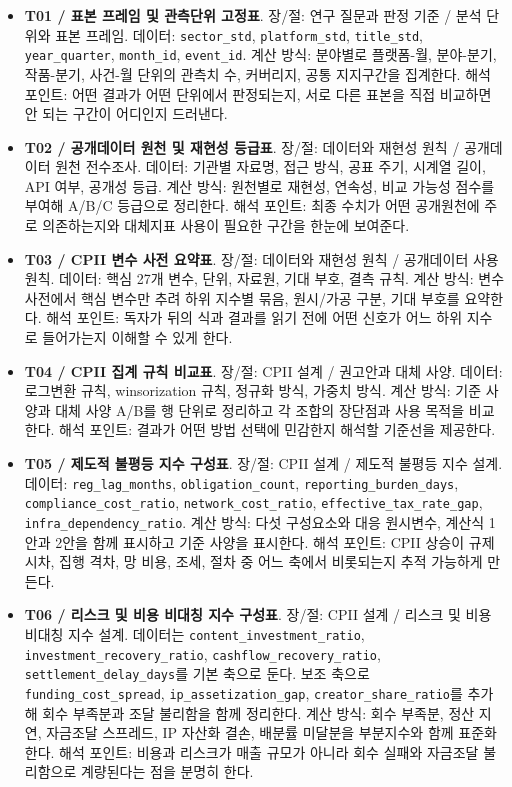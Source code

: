 \documentclass[11pt,a4paper]{report}
\newenvironment{summarylist}{\begin{itemize}[leftmargin=1.8em,itemsep=0.35em,topsep=0.35em]\RaggedRight}{\end{itemize}}
\begin{document}
\begingroup
\scriptsize
\begin{summarylist}
  \item \textbf{T01 / 표본 프레임 및 관측단위 고정표}. 장/절: 연구 질문과 판정 기준 / 분석 단위와 표본 프레임. 데이터: \texttt{sector\_std}, \texttt{platform\_std}, \texttt{title\_std}, \texttt{year\_quarter}, \texttt{month\_id}, \texttt{event\_id}. 계산 방식: 분야별로 플랫폼-월, 분야-분기, 작품-분기, 사건-월 단위의 관측치 수, 커버리지, 공통 지지구간을 집계한다. 해석 포인트: 어떤 결과가 어떤 단위에서 판정되는지, 서로 다른 표본을 직접 비교하면 안 되는 구간이 어디인지 드러낸다.
  \item \textbf{T02 / 공개데이터 원천 및 재현성 등급표}. 장/절: 데이터와 재현성 원칙 / 공개데이터 원천 전수조사. 데이터: 기관별 자료명, 접근 방식, 공표 주기, 시계열 길이, API 여부, 공개성 등급. 계산 방식: 원천별로 재현성, 연속성, 비교 가능성 점수를 부여해 A/B/C 등급으로 정리한다. 해석 포인트: 최종 수치가 어떤 공개원천에 주로 의존하는지와 대체지표 사용이 필요한 구간을 한눈에 보여준다.
  \item \textbf{T03 / CPII 변수 사전 요약표}. 장/절: 데이터와 재현성 원칙 / 공개데이터 사용 원칙. 데이터: 핵심 27개 변수, 단위, 자료원, 기대 부호, 결측 규칙. 계산 방식: 변수 사전에서 핵심 변수만 추려 하위 지수별 묶음, 원시/가공 구분, 기대 부호를 요약한다. 해석 포인트: 독자가 뒤의 식과 결과를 읽기 전에 어떤 신호가 어느 하위 지수로 들어가는지 이해할 수 있게 한다.
  \item \textbf{T04 / CPII 집계 규칙 비교표}. 장/절: CPII 설계 / 권고안과 대체 사양. 데이터: 로그변환 규칙, winsorization 규칙, 정규화 방식, 가중치 방식. 계산 방식: 기준 사양과 대체 사양 A/B를 행 단위로 정리하고 각 조합의 장단점과 사용 목적을 비교한다. 해석 포인트: 결과가 어떤 방법 선택에 민감한지 해석할 기준선을 제공한다.
  \item \textbf{T05 / 제도적 불평등 지수 구성표}. 장/절: CPII 설계 / 제도적 불평등 지수 설계. 데이터: \texttt{reg\_lag\_months}, \texttt{obligation\_count}, \texttt{reporting\_burden\_days}, \texttt{compliance\_cost\_ratio}, \texttt{network\_cost\_ratio}, \texttt{effective\_tax\_rate\_gap}, \texttt{infra\_dependency\_ratio}. 계산 방식: 다섯 구성요소와 대응 원시변수, 계산식 1안과 2안을 함께 표시하고 기준 사양을 표시한다. 해석 포인트: CPII 상승이 규제 시차, 집행 격차, 망 비용, 조세, 절차 중 어느 축에서 비롯되는지 추적 가능하게 만든다.
  \item \textbf{T06 / 리스크 및 비용 비대칭 지수 구성표}. 장/절: CPII 설계 / 리스크 및 비용 비대칭 지수 설계. 데이터는 \texttt{content\_investment\_ratio}, \texttt{investment\_recovery\_ratio}, \texttt{cashflow\_recovery\_ratio}, \texttt{settlement\_delay\_days}를 기본 축으로 둔다. 보조 축으로 \texttt{funding\_cost\_spread}, \texttt{ip\_assetization\_gap}, \texttt{creator\_share\_ratio}를 추가해 회수 부족분과 조달 불리함을 함께 정리한다. 계산 방식: 회수 부족분, 정산 지연, 자금조달 스프레드, IP 자산화 결손, 배분률 미달분을 부분지수와 함께 표준화한다. 해석 포인트: 비용과 리스크가 매출 규모가 아니라 회수 실패와 자금조달 불리함으로 계량된다는 점을 분명히 한다.

\end{summarylist}
\end{document}
